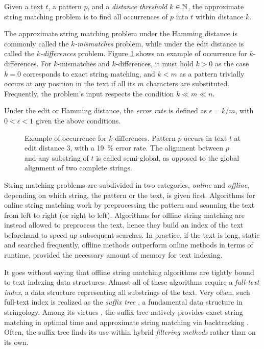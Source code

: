 \begin{definition}
\citep{Galil1988}
Given a text $t$, a pattern $p$, and a \emph{distance threshold} $k \in \mathbb {N}$, the approximate string matching problem is to find all occurrences of $p$ into $t$ within distance $k$.
\end{definition}
The approximate string matching problem under the Hamming distance is commonly called the \emph{$k$-mismatches} problem, while under the edit distance is called the \emph{$k$-differences} problem.
Figure \ref{fig:edit-occurrence} shows an example of occurrence for $k$-differences.
For $k$-mismatches and $k$-differences, it must hold $k > 0$ as the case $k = 0$ corresponds to exact string matching, and $k < m$ as a pattern trivially occurs at any position in the text if all its $m$ characters are substituted.
Frequently, the problem's input respects the condition $k \ll m \ll n$.
\begin{definition}
Under the edit or Hamming distance, the \emph{error rate} is defined as $\epsilon = k/m$, with $0 < \epsilon < 1$ given the above conditions.
\end{definition}

\begin{figure}[t]
\begin{center}
\caption[Example of occurrence for $k$-differences]{Example of occurrence for $k$-differences. Pattern $p$ occurs in text $t$ at edit distance 3, \ie with a 19~\% error rate.
The alignment between $p$ and any substring of $t$ is called semi-global, as opposed to the global alignment of two complete strings.
}
\label{fig:edit-occurrence}

\end{center}
\end{figure}

String matching problems are subdivided in two categories, \emph{online} and \emph{offline}, depending on which string, the pattern or the text, is given first.
Algorithms for online string matching work by preprocessing the pattern and scanning the text from left to right (or right to left).
Algorithms for offline string matching are instead allowed to preprocess the text,
hence they build an index of the text beforehand to speed up subsequent searches.
In practice, if the text is long, static and searched frequently, offline methods outperform online methods in terms of runtime, provided the necessary amount of memory for text indexing.

It goes without saying that offline string matching algorithms are tightly bound to text indexing data structures.
Almost all of these algorithms require a \emph{full-text index}, \ie a data structure representing all substrings of the text.
Very often, such full-text index is realized as the \emph{suffix tree} \citep{Weiner1973}, a fundamental data structure in stringology.
Among its virtues \citep{Apostolico1985}, the suffix tree natively provides exact string matching in optimal time and approximate string matching via backtracking \citep{Ukkonen1993}.
Often, the suffix tree finds its use within hybrid \emph{filtering methods} rather than on its own.

